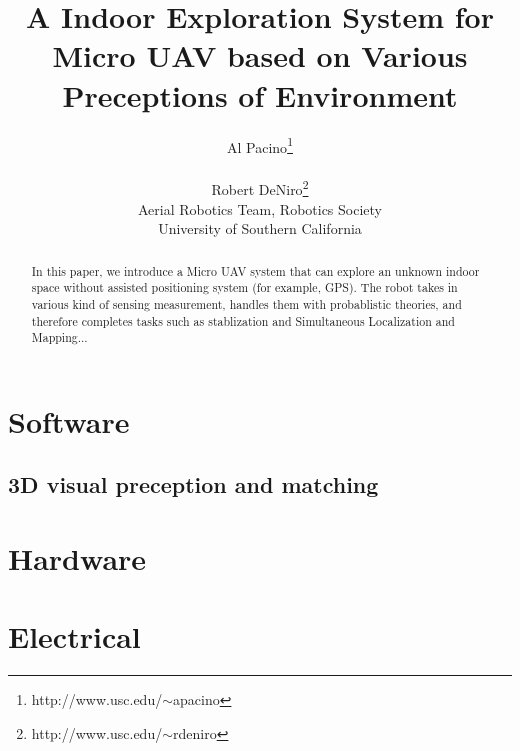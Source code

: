 \documentclass[12pt,letterpaper]{article}
\title{
	\bf{A Indoor Exploration System for Micro UAV based on Various Preceptions of Environment}
}
\author{
	Al Pacino\footnote{http://www.usc.edu/$\sim$apacino}\rule{20pt}{0pt}
	Robert DeNiro\footnote{http://www.usc.edu/$\sim$rdeniro}\\
	\normalsize{Aerial Robotics Team, Robotics Society}\\
	\normalsize{University of Southern California}
}
\begin{document}
\maketitle

\begin{abstract}
	In this paper, we introduce a Micro UAV system that can explore an unknown indoor space without assisted positioning system (for example, GPS). The robot takes in various kind of sensing measurement, handles them with probablistic theories, and therefore completes tasks such as stablization and Simultaneous Localization and Mapping...
\end{abstract}	
	
\section{Software}
	\subsection{3D visual preception and matching}

\section{Hardware}

\section{Electrical}
\end{document}
